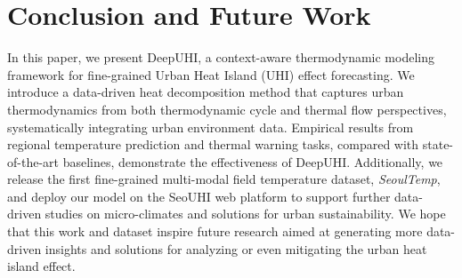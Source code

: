 \section{Conclusion and Future Work}
\label{sec:conclusion}
In this paper, we present DeepUHI, a context-aware thermodynamic modeling framework for fine-grained Urban Heat Island (UHI) effect forecasting. We introduce a data-driven heat decomposition method that captures urban thermodynamics from both thermodynamic cycle and thermal flow perspectives, systematically integrating urban environment data. Empirical results from regional temperature prediction and thermal warning tasks, compared with state-of-the-art baselines, demonstrate the effectiveness of DeepUHI. Additionally, we release the first fine-grained multi-modal field temperature dataset, \textit{SeoulTemp}, and deploy our model on the SeoUHI web platform to support further data-driven studies on micro-climates and solutions for urban sustainability. We hope that this work and dataset inspire future research aimed at generating more data-driven insights and solutions for analyzing or even mitigating the urban heat island effect.

